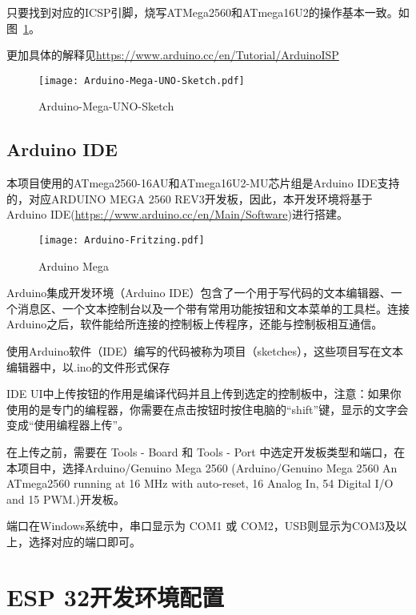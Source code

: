 只要找到对应的ICSP引脚，烧写ATMega2560和ATmega16U2的操作基本一致。如图~\ref{fig:Arduino-Mega-UNO-Sketch}。

更加具体的解释见\url{https://www.arduino.cc/en/Tutorial/ArduinoISP}

\begin{figure}[htbp]
    \centering
    \texttt{[image: Arduino-Mega-UNO-Sketch.pdf]}
    \caption{Arduino-Mega-UNO-Sketch}
    \label{fig:Arduino-Mega-UNO-Sketch}
\end{figure}

\subsection{Arduino IDE}

本项目使用的ATmega2560-16AU和ATmega16U2-MU芯片组是Arduino IDE支持的，对应ARDUINO MEGA 2560 REV3开发板，因此，本开发环境将基于Arduino IDE(\url{https://www.arduino.cc/en/Main/Software})进行搭建。

\begin{figure}[htbp]
    \centering
    \texttt{[image: Arduino-Fritzing.pdf]}
    \caption{Arduino Mega}
    \label{fig:Arduino-Fritzing}
\end{figure}

Arduino集成开发环境（Arduino IDE）包含了一个用于写代码的文本编辑器、一个消息区、一个文本控制台以及一个带有常用功能按钮和文本菜单的工具栏。连接Arduino之后，软件能给所连接的控制板上传程序，还能与控制板相互通信。

使用Arduino软件（IDE）编写的代码被称为项目（sketches），这些项目写在文本编辑器中，以.ino的文件形式保存

IDE UI中上传按钮的作用是编译代码并且上传到选定的控制板中，注意：如果你使用的是专门的编程器，你需要在点击按钮时按住电脑的“shift”键，显示的文字会变成“使用编程器上传”。

在上传之前，需要在 Tools - Board 和 Tools - Port 中选定开发板类型和端口，在本项目中，选择Arduino/Genuino Mega 2560 (Arduino/Genuino Mega 2560
An ATmega2560 running at 16 MHz with auto-reset, 16 Analog In, 54 Digital I/O and 15 PWM.)开发板。

端口在Windows系统中，串口显示为 COM1 或 COM2，USB则显示为COM3及以上，选择对应的端口即可。



\section{ESP 32开发环境配置}

